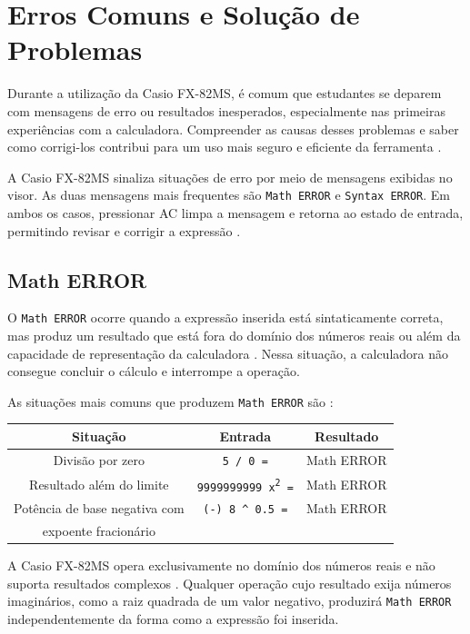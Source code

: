\chapter{Erros Comuns e Solução de Problemas}

Durante a utilização da Casio FX-82MS, é comum que estudantes se deparem com mensagens de erro ou resultados inesperados, especialmente nas primeiras experiências com a calculadora. Compreender as causas desses problemas e saber como corrigi-los contribui para um uso mais seguro e eficiente da ferramenta \cite{casio2004}.

A Casio FX-82MS sinaliza situações de erro por meio de mensagens exibidas no visor. As duas mensagens mais frequentes são \texttt{Math ERROR} e \texttt{Syntax ERROR}. Em ambos os casos, pressionar AC limpa a mensagem e retorna ao estado de entrada, permitindo revisar e corrigir a expressão \cite{casio2004}.

\section{Math ERROR}

O \texttt{Math ERROR} ocorre quando a expressão inserida está sintaticamente correta, mas produz um resultado que está fora do domínio dos números reais ou além da capacidade de representação da calculadora \cite{casio2004}. Nessa situação, a calculadora não consegue concluir o cálculo e interrompe a operação.

As situações mais comuns que produzem \texttt{Math ERROR} são \cite{casio2004}:

\begin{table}[H]
    \centering
    \begin{tabular}{|c|c|c|}
        \hline
        \textbf{Situação} & \textbf{Entrada} & \textbf{Resultado} \\ \hline
        Divisão por zero & \texttt{5 / 0 =} & Math ERROR \\
        Resultado além do limite & \texttt{9999999999 x\textsuperscript{2} =} & Math ERROR \\
        Potência de base negativa com & \texttt{(-) 8 \^{} 0.5 =} & Math ERROR \\
        \quad expoente fracionário  & & \\ \hline
    \end{tabular}
\end{table}

A Casio FX-82MS opera exclusivamente no domínio dos números reais e não suporta resultados complexos \cite{casio2004}. Qualquer operação cujo resultado exija números imaginários, como a raiz quadrada de um valor negativo, produzirá \texttt{Math ERROR} independentemente da forma como a expressão foi inserida.

